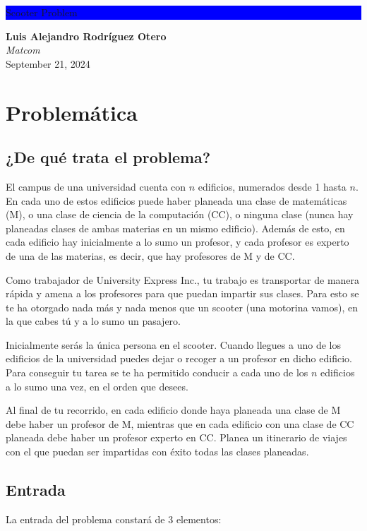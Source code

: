 \documentclass[11pt]{article}
\begin{document}
\begin{titlepage}
    \centering
    \colorbox{blue}{\parbox{\textwidth}{\centering\color{white}\Huge Scooter Problem}}
    \vfill
    \Large
    \textbf{Luis Alejandro Rodríguez Otero} \\
    \textit{Matcom} \\
    September 21, 2024
    \vfill
\end{titlepage}

    \newpage

    \tableofcontents
    \newpage

    \section{Problemática}
    \subsection{¿De qué trata el problema?}
    El campus de una universidad cuenta con $n$ edificios, numerados desde 1 hasta $n$. En cada uno de estos
    edificios puede haber planeada una clase de matemáticas (M), o una clase de ciencia de la computación (CC), 
    o ninguna clase (nunca hay planeadas clases de ambas materias en un mismo edificio). Además de esto, en 
    cada edificio hay inicialmente a lo sumo un profesor, y cada profesor es experto de una de las materias, es 
    decir, que hay profesores de M y de CC.
    
    Como trabajador de University Express Inc., tu trabajo es transportar de manera rápida y amena a los
    profesores para que puedan impartir sus clases. Para esto se te ha otorgado nada más y nada menos que un
    scooter (una motorina vamos), en la que cabes tú y a lo sumo un pasajero.
    
    Inicialmente serás la única persona en el scooter. Cuando llegues a uno de los edificios de la universidad
    puedes dejar o recoger a un profesor en dicho edificio. Para conseguir tu tarea se te ha permitido conducir
    a cada uno de los $n$ edificios a lo sumo una vez, en el orden que desees.

    Al final de tu recorrido, en cada edificio donde haya planeada una clase de M debe haber un profesor de M, 
    mientras que en cada edificio con una clase de CC planeada debe haber un profesor experto en CC. Planea un 
    itinerario de viajes con el que puedan ser impartidas con éxito todas las clases planeadas.

    \subsection{Entrada}
    La entrada del problema constará de 3 elementos:
\end{document}

